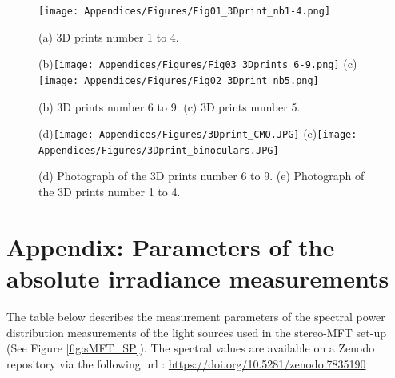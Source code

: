 \begin{appendices}
\vspace{2cm}



\begin{figure}[!h]
\centering
\texttt{[image: Appendices/Figures/Fig01\_3Dprint\_nb1-4.png]}
\caption*{(a) 3D prints number 1 to 4.}
\label{fig:sMFT_3Dprints_1-4}
\end{figure}


\begin{figure}[!h]
  \centering
  
  \subfigure(b){\texttt{[image: Appendices/Figures/Fig03\_3Dprints\_6-9.png]}} 
  \subfigure(c){\texttt{[image: Appendices/Figures/Fig02\_3Dprint\_nb5.png]}} 
  \caption*{(b) 3D prints number 6 to 9. (c) 3D prints number 5.}
  
  \vspace{2cm}
\end{figure}




\begin{figure}[!h]
  \centering
  
  \subfigure(d){\texttt{[image: Appendices/Figures/3Dprint\_CMO.JPG]}} 
  \subfigure(e){\texttt{[image: Appendices/Figures/3Dprint\_binoculars.JPG]}} 

  \caption*{(d) Photograph of the 3D prints number 6 to 9. (e) Photograph of the 3D prints number 1 to 4.}
\end{figure}

\vspace{2cm}



\section[\hspace{0.3cm}Parameters of the absolute irradiance measurements]{ Appendix: Parameters of the absolute irradiance measurements}
\label{app:ch3_lamps_measurements}

The table below describes the measurement parameters of the spectral power distribution
measurements of the light sources used in the stereo-MFT set-up (See Figure \ref{fig:sMFT_SP}). The spectral values are available on a Zenodo repository via the following url : \url{https://doi.org/10.5281/zenodo.7835190}


\end{appendices}
